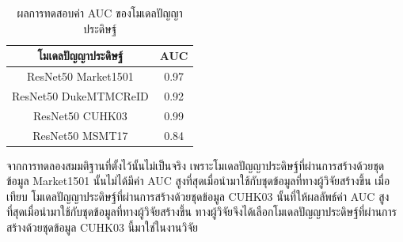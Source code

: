 \clearpage
\begin{table}[!ht]
    \centering
    \begin{tabular}{|c|c|}
            \hline
            {โมเดลปัญญาประดิษฐ์}&{AUC}											\\
            \hline
            ResNet50 Market1501	 		& 0.97 								\\
            ResNet50 DukeMTMCReID		& 0.92								\\
            ResNet50 CUHK03				& 0.99								\\
            ResNet50 MSMT17				& 0.84								\\
        \hline
    \end{tabular}
    \caption{ผลการทดสอบค่า AUC ของโมเดลปัญญาประดิษฐ์}
    \label{tab: AUC of model ReID}
\end{table}

จากการทดลองสมมติฐานที่ตั้งไว้นั้นไม่เป็นจริง เพราะโมเดลปัญญาประดิษฐ์ที่ผ่านการสร้างด้วยชุดข้อมูล Market1501 นั้นไม่ได้มีค่า AUC สูงที่สุดเมื่อนำมาใช้กับชุดข้อมูลที่ทางผู้วิจัยสร้างขึ้น เมื่อเทียบ โมเดลปัญญาประดิษฐ์ที่ผ่านการสร้างด้วยชุดข้อมูล CUHK03 นั้นที่ให้ผลลัพธ์ค่า AUC สูงที่สุดเมื่อนำมาใช้กับชุดข้อมูลที่ทางผู้วิจัยสร้างขึ้น ทางผู้วิจัยจึงได้เลือกโมเดลปัญญาประดิษฐ์ที่ผ่านการสร้างด้วยชุดข้อมูล CUHK03 นี้มาใช่ในงานวิจัย